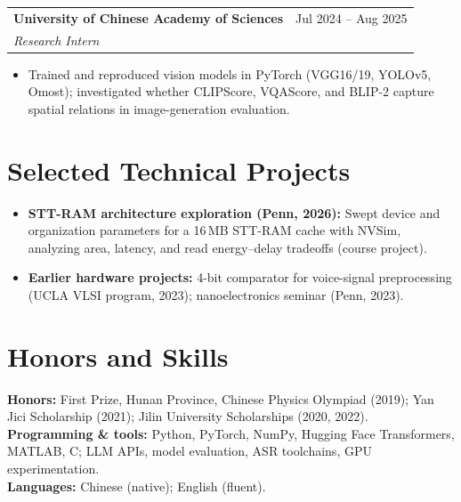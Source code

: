 \documentclass[10pt]{article}
\makeatletter
\newcommand{\entry}[4]{%
  \begin{tabularx}{\linewidth}{@{}X r@{}}
    \textbf{#1} & #2 \\
    \textit{#3} & \textit{#4} \\
  \end{tabularx}\vspace{-0.2ex}}
\makeatother
\begin{document}
\vspace{0.4ex}
\entry{University of Chinese Academy of Sciences}{Jul 2024 -- Aug 2025}{Research Intern}{}
\begin{itemize}
  \item Trained and reproduced vision models in PyTorch (VGG16/19, YOLOv5, Omost); investigated whether CLIPScore, VQAScore, and BLIP-2 capture spatial relations in image-generation evaluation.
\end{itemize}

\section{Selected Technical Projects}
\begin{itemize}
  \item \textbf{STT-RAM architecture exploration (Penn, 2026):} Swept device and organization parameters for a 16\,MB STT-RAM cache with NVSim, analyzing area, latency, and read energy--delay tradeoffs (course project).
  \item \textbf{Earlier hardware projects:} 4-bit comparator for voice-signal preprocessing (UCLA VLSI program, 2023); nanoelectronics seminar (Penn, 2023).
\end{itemize}

\section{Honors and Skills}
\textbf{Honors:} First Prize, Hunan Province, Chinese Physics Olympiad (2019); Yan Jici Scholarship (2021); Jilin University Scholarships (2020, 2022).\\
\textbf{Programming \& tools:} Python, PyTorch, NumPy, Hugging Face Transformers, MATLAB, C; LLM APIs, model evaluation, ASR toolchains, GPU experimentation.\\
\textbf{Languages:} Chinese (native); English (fluent).
\end{document}
